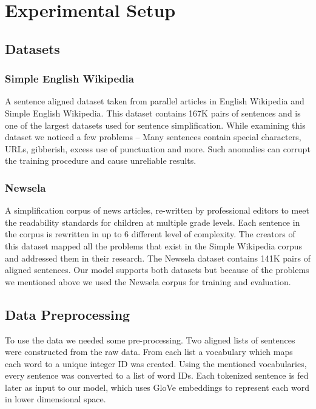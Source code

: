 \documentclass{article}
\begin{document}
\section{Experimental Setup}
\subsection{Datasets}
\subsubsection{Simple English Wikipedia \cite{coster-kauchak-2011-simple}}
A sentence aligned dataset taken from parallel articles in English Wikipedia and Simple English Wikipedia. This dataset contains 167K pairs of sentences and is one of the largest datasets used for sentence simplification. While examining this dataset we noticed a few problems – Many sentences contain special characters, URLs, gibberish, excess use of punctuation and more. Such anomalies can corrupt the training procedure and cause unreliable results.

\subsubsection{Newsela \cite{Xu-EtAl:2015:TACL}}
A simplification corpus of news articles, re-written by professional editors to meet the readability standards for children at multiple grade levels. Each sentence in the corpus is rewritten in up to 6 different level of complexity. The creators of this dataset mapped all the problems that exist in the Simple Wikipedia corpus and addressed them in their research. The Newsela dataset contains 141K pairs of aligned sentences.
Our model supports both datasets but because of the problems we mentioned above we used the Newsela corpus for training and evaluation.


\subsection{Data Preprocessing}
To use the data we needed some pre-processing. Two aligned lists of sentences were constructed from the raw data. From each list a vocabulary which maps each word to a unique integer ID was created. Using the mentioned vocabularies, every sentence was converted to a list of word IDs. Each tokenized sentence is fed later as input to our model, which uses GloVe embeddings \cite{pennington2014glove} to represent each word in lower dimensional space.
\end{document}
